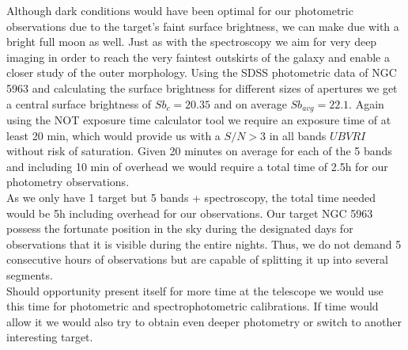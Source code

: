 \documentclass[11pt]{article}           %
\begin{document}
\begin{justificpage}[][]{}
{\noindent Although dark conditions would have been optimal for our photometric observations due to the target's faint surface brightness, we can make due with a bright full moon as well. Just as with the spectroscopy we aim for very deep imaging in order to reach the very faintest outskirts of the galaxy and enable a closer study of the outer morphology. Using the SDSS photometric data of NGC 5963 and calculating the surface brightness for different sizes of apertures we get a central surface brightness of $Sb_c = 20.35$ and on average $Sb_{avg} = 22.1$. Again using the NOT exposure time calculator tool we require an exposure time of at least 20 min, which would provide us with a $S/N> 3$ in all bands \(UBVRI\) without risk of saturation. Given 20 minutes on average for each of the 5 bands and including 10 min of overhead we would require a total time of 2.5h for our photometry observations. \\

\noindent As we only have 1 target but 5 bands + spectroscopy, the total time needed would be 5h including overhead for our observations.  Our target NGC 5963 possess the fortunate position in the sky during the designated days for observations that it is visible during the entire nights. Thus, we do not demand 5 consecutive hours of observations but are capable of splitting it up into several segments. \\

\noindent Should opportunity present itself for more time at the telescope we would use this time for photometric and spectrophotometric calibrations. If time would allow it we would also try to obtain even deeper photometry or switch to another interesting target.}
\end{justificpage}
\end{document}
